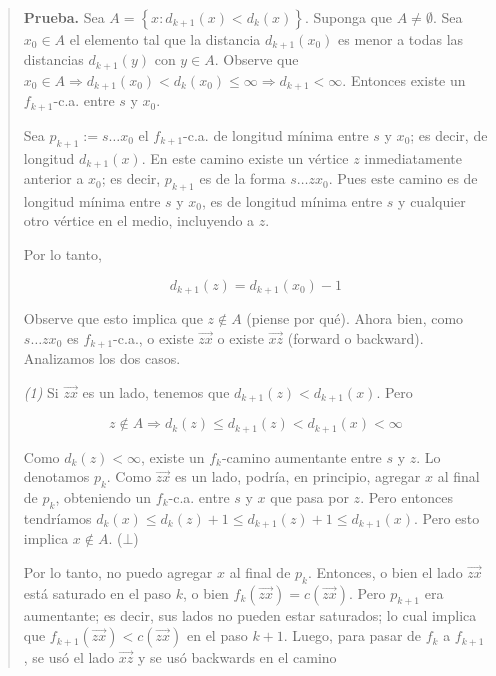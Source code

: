 \documentclass[a4paper]{article}
\begin{document}
\small
\begin{quote}

\textbf{Prueba.} Sea $A = \left\{ x : d_{k+1}(x) < d_k(x) \right\} $. Suponga
que $A \neq \emptyset$. Sea $x_0 \in A$ el elemento tal que la distancia
$d_{k+1}(x_0)$ es menor a todas las distancias $d_{k+1}(y)$ con $y \in A$.
Observe que $x_0 \in A \Rightarrow d_{k+1}(x_0) < d_{k}(x_0) \leq \infty
\Rightarrow d_{k+1} < \infty$. Entonces existe un $f_{k+1}$-c.a. entre $s$ y
$x_0$.

Sea $p_{k+1} := s \ldots x_0$ el $f_{k+1}$-c.a. de longitud mínima entre $s$ y
$x_0$; es decir, de longitud $d_{k+1}(x)$. En este camino existe un vértice $z$
inmediatamente anterior a $x_0$; es decir, $p_{k+1}$ es de la
forma $s \ldots z x_0$. Pues este camino es de longitud mínima entre $s$ y
$x_0$, es de longitud mínima entre $s$ y cualquier otro vértice en el medio,
incluyendo a $z$.

Por lo tanto,

\begin{equation} d_{k+1}(z) = d_{k+1}(x_0) - 1 \end{equation}

Observe que esto implica que $z \not\in A$ (piense por qué). Ahora bien, como
$s \ldots zx_0$ es $f_{k+1}$-c.a., o existe $\overrightarrow{zx}$ o existe
$\overrightarrow{xz}$ (forward o backward). Analizamos los dos casos.

\textit{(1)} Si $\overrightarrow{zx}$ es un lado, tenemos que
$d_{k+1}(z) < d_{k+1}(x)$. Pero 

$$z \not\in A \Rightarrow d_{k}(z) \leq d_{k+1}(z) < d_{k+1}(x) < \infty$$ 

Como $d_{k}(z) < \infty$, existe un $f_k$-camino aumentante entre $s$ y $z$. Lo
denotamos $p_k$. Como $\overrightarrow{zx}$ es un lado, podría, en principio,
agregar $x$ al final de $p_k$, obteniendo un $f_k$-c.a. entre $s$ y $x$ que
pasa por $z$. Pero entonces tendríamos $d_k(x) \leq d_k(z) + 1 \leq d_{k+1}(z)
+ 1 \leq d_{k+1}(x)$. Pero esto implica $x \not\in A$. ($\bot$)

Por lo tanto, no puedo agregar $x$ al final de $p_k$. Entonces, o bien el lado
$\overrightarrow{zx}$ está saturado en el paso $k$, o bien
$f_k(\overrightarrow{zx}) = c(\overrightarrow{zx})$. Pero $p_{k+1}$ era
aumentante; es decir, sus lados no pueden estar saturados; lo cual implica que
$f_{k+1}(\overrightarrow{zx}) < c(\overrightarrow{zx})$ en el paso $k+1$.
Luego, para pasar de $f_k$ a $f_{k+1}$, se usó el lado $\overrightarrow{xz}$ y
se usó backwards en el camino 


\end{quote}
\end{document}

